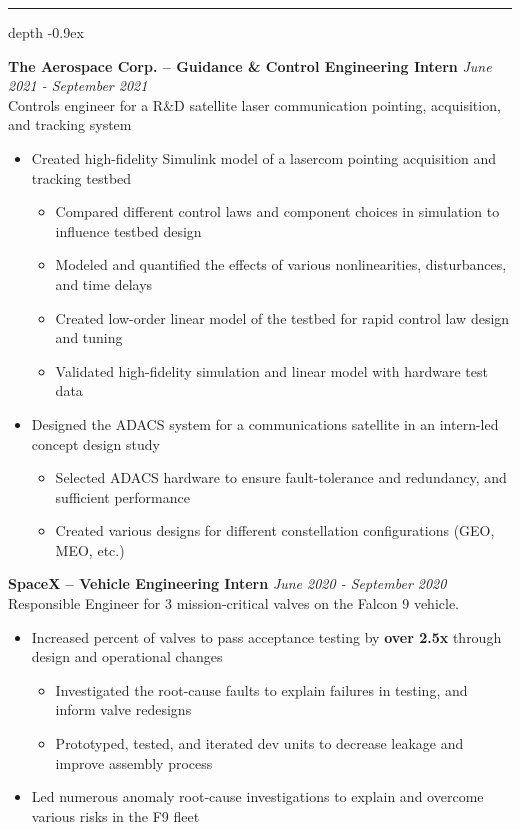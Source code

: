 \documentclass[11pt, letterpaper]{article}
\newcommand\smallspace{4pt}
\newcommand\indentlength{0.25in}
\def\Vhrulefill{\leavevmode\leaders\hrule height 1ex depth \dimexpr0.1pt-0.9ex\hfill\kern0pt}
\newenvironment{category}[1]
{
	\vspace{\smallspace}
	\noindent {\LARGE{\sc{#1}}} \hspace{2pt}
	\Vhrulefill
	\vspace{\smallspace}
	\begin{addmargin}[\indentlength]{0in}
}
{
	\end{addmargin}
	\vspace{\smallspace}
}
\newenvironment{experience}[4][3]{
	\vspace{\smallspace}
	\noindent\textbf{#2}
	\hfill \textit{#3} \\
	#4
	\vspace{\smallspace}
	\begin{itemize}
	}
	{
	\end{itemize}
	\vspace{\smallspace}
}
\begin{document}
\begin{category}{Work Experience}
\begin{experience}{The Aerospace Corp. -- Guidance \& Control Engineering Intern}{June 2021 - September 2021}{Controls engineer for a R\&D satellite laser communication pointing, acquisition, and tracking system}
	\item Created high-fidelity Simulink model of a lasercom pointing acquisition and tracking testbed
	\begin{itemize}[noitemsep,nolistsep]
		\item Compared different control laws and component choices in simulation to influence testbed design
		\item Modeled and quantified the effects of various nonlinearities, disturbances, and time delays
		\item Created low-order linear model of the testbed for rapid control law design and tuning
		\item Validated high-fidelity simulation and linear model with hardware test data
	\end{itemize}
	\item Designed the ADACS system for a communications satellite  in an intern-led concept design study
	\begin{itemize}[noitemsep,nolistsep]
		\item Selected ADACS hardware to ensure fault-tolerance and redundancy, and sufficient performance
		\item Created various designs for different constellation configurations (GEO, MEO, etc.)
	\end{itemize}
\end{experience}

\begin{experience}{SpaceX -- Vehicle Engineering Intern}{June 2020 - September 2020}{Responsible Engineer for 3 mission-critical valves on the Falcon 9 vehicle.}
	\item Increased percent of valves to pass acceptance testing by \textbf{over 2.5x} through design and operational changes
	\begin{itemize}[noitemsep,nolistsep]
		\item Investigated the root-cause faults to explain failures in testing, and inform valve redesigns
		\item Prototyped, tested, and iterated dev units to decrease leakage and improve assembly process
	\end{itemize}
	\item Led numerous anomaly root-cause investigations to explain and overcome various risks in the F9 fleet
\end{experience}


\end{category}
\end{document}
